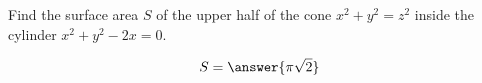 \documentclass{ximera}
\author{David Guichard \and Neal Koblitz \and H. Jerome Keisler \and Albert Scheller \and Barry Balof \and Mike Wills \and Matthew Carr}
\begin{document}
\begin{exercise}





Find the surface area $S$ of the upper half of the cone $x^2+y^2=z^2$ inside the cylinder $x^2+y^2-2x=0$.

\begin{prompt}
\[
S=\answer{\pi \sqrt{2}}
\]
\end{prompt}



\end{exercise}
\end{document}
